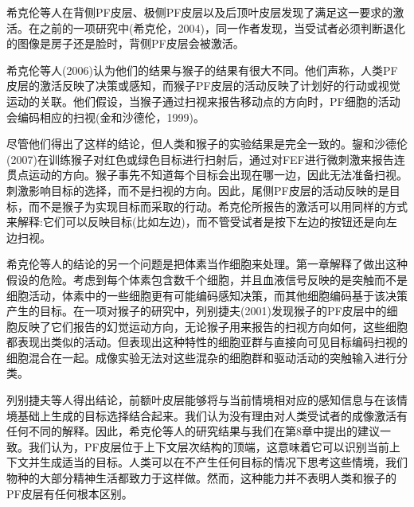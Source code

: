 希克伦等人在背侧PF皮层、极侧PF皮层以及后顶叶皮层发现了满足这一要求的激活。在之前的一项研究中(希克伦，2004)，同一作者发现，当受试者必须判断退化的图像是房子还是脸时，背侧PF皮层会被激活。
\par
希克伦等人(2006)认为他们的结果与猴子的结果有很大不同。他们声称，人类PF皮层的激活反映了决策或感知，而猴子PF皮层的活动反映了计划好的行动或视觉运动的关联。他们假设，当猴子通过扫视来报告移动点的方向时，PF细胞的活动会编码相应的扫视(金和沙德伦，1999)。
\par
尽管他们得出了这样的结论，但人类和猴子的实验结果是完全一致的。鋆和沙德伦(2007)在训练猴子对红色或绿色目标进行扫射后，通过对FEF进行微刺激来报告连贯点运动的方向。猴子事先不知道每个目标会出现在哪一边，因此无法准备扫视。刺激影响目标的选择，而不是扫视的方向。因此，尾侧PF皮层的活动反映的是目标，而不是猴子为实现目标而采取的行动。希克伦所报告的激活可以用同样的方式来解释:它们可以反映目标(比如左边)，而不管受试者是按下左边的按钮还是向左边扫视。
\par
希克伦等人的结论的另一个问题是把体素当作细胞来处理。第一章解释了做出这种假设的危险。考虑到每个体素包含数千个细胞，并且血液信号反映的是突触而不是细胞活动，体素中的一些细胞更有可能编码感知决策，而其他细胞编码基于该决策产生的目标。在一项对猴子的研究中，列别捷夫(2001)发现猴子的PF皮层中的细胞反映了它们报告的幻觉运动方向，无论猴子用来报告的扫视方向如何，这些细胞都表现出类似的活动。但表现出这种特性的细胞亚群与直接向可见目标编码扫视的细胞混合在一起。成像实验无法对这些混杂的细胞群和驱动活动的突触输入进行分类。
\par
列别捷夫等人得出结论，前额叶皮层能够将与当前情境相对应的感知信息与在该情境基础上生成的目标选择结合起来。我们认为没有理由对人类受试者的成像激活有任何不同的解释。因此，希克伦等人的研究结果与我们在第8章中提出的建议一致。我们认为，PF皮层位于上下文层次结构的顶端，这意味着它可以识别当前上下文并生成适当的目标。人类可以在不产生任何目标的情况下思考这些情境，我们物种的大部分精神生活都致力于这样做。然而，这种能力并不表明人类和猴子的PF皮层有任何根本区别。

